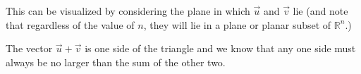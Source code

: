 This can be visualized by considering the plane in which $\vec{u}$ and $\vec{v}$ lie (and note that regardless of the value of $n$, they will lie in a plane or planar subset of $\mathbb{R}^n$.)


\begin{center}
\end{center}

The vector $\vec{u}+\vec{v}$ is one side of the triangle and we know that any one side must always be no larger than the sum of the other two.


